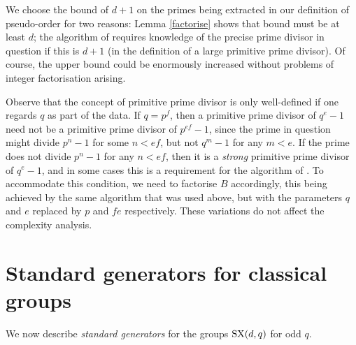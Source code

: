 \documentclass[12pt]{article}
\def\SX{{\rm SX}}
\begin{document}
We choose the bound of $d+1$ on the primes being extracted
in our definition of pseudo-order for two reasons: 
Lemma \ref{factorise} shows that bound must be at least $d$;
the algorithm of \cite{NP} requires knowledge of
the precise prime divisor in question if this is $d+1$ (in the
definition of a large primitive prime divisor).  Of course,
the upper bound could be enormously increased without problems of
integer factorisation arising.

Observe that the concept of primitive prime divisor is only
well-defined if one regards $q$ as part of the data.
If $q=p^f$, then a primitive prime divisor of $q^e-1$
need not be a primitive prime divisor of $p^{ef}-1$, 
since the prime in question might divide $p^n-1$ for some
$n<ef$, but not $q^m-1$ for any $m<e$.  If the prime does not divide
$p^n-1$ for any $n<ef$, then it is a \emph{strong} primitive prime 
divisor of $q^e-1$, and in some cases this
is a requirement for the algorithm of \cite{NP}.  To accommodate
this condition, we need to factorise $B$ accordingly, 
this being achieved by the same algorithm that was used above, 
but with the parameters $q$ and $e$ replaced by $p$ and $fe$
respectively.  These variations do not affect the complexity analysis.

\section{Standard generators for classical groups}
\label{standard}
We now describe {\it standard generators} for
the groups $\SX(d,q)$ for odd $q$.
\end{document}
